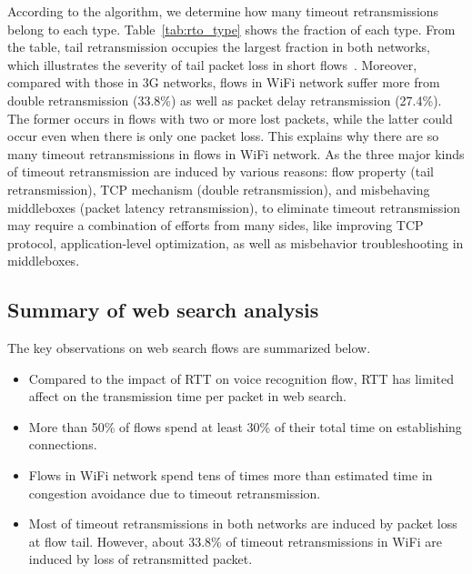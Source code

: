 According to the algorithm, we determine how many timeout retransmissions belong to each type. Table~\ref{tab:rto_type} shows the fraction of each type. From the table, tail retransmission occupies the largest fraction in both networks, which illustrates the severity of tail packet loss in short flows~\cite{flach2013reducing}. Moreover, compared with those in 3G networks, flows in WiFi network suffer more from double retransmission (33.8\%) as well as packet delay retransmission (27.4\%). The former occurs in flows with two or more lost packets, while the latter could occur even when there is only one packet loss. This explains why there are so many timeout retransmissions in flows in WiFi network. As the three major kinds of timeout retransmission are induced by various reasons: flow property (tail retransmission), TCP mechanism (double retransmission), and misbehaving middleboxes (packet latency retransmission), to eliminate timeout retransmission may require a combination of efforts from many sides, like improving TCP protocol, application-level optimization, as well as misbehavior troubleshooting in middleboxes.

\subsection{Summary of web search analysis}

The key observations on web search flows are summarized below.

\begin{itemize}
	\item Compared to the impact of RTT on voice recognition flow, RTT has limited affect on the transmission time per packet in web search.
	\item More than 50\% of flows spend at least 30\% of their total time on establishing connections.
	\item Flows in WiFi network spend tens of times more than estimated time in congestion avoidance due to timeout retransmission.
	\item Most of timeout retransmissions in both networks are induced by packet loss at flow tail. However, about 33.8\% of timeout retransmissions in WiFi are induced by loss of retransmitted packet.
\end{itemize}
